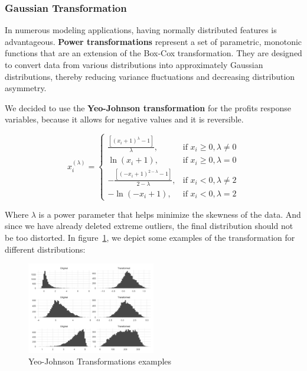 \documentclass[11pt,english,a4paper,hidelinks]{book}
\begin{document}
\subsubsection{Gaussian Transformation}

In numerous modeling applications, having normally distributed features is advantageous. \textbf{Power transformations} represent a set of parametric, monotonic functions that are an extension of the Box-Cox transformation. They are designed to convert data from various distributions into approximately Gaussian distributions, thereby reducing variance fluctuations and decreasing distribution asymmetry. 

\vspace{0.5cm}
\noindent We decided to use the \textbf{Yeo-Johnson transformation} for the profits response variables, because it allows for negative values and it is reversible.

\begin{equation}
x_i^{(\lambda)} =
\begin{cases}
\frac{[{(x_i + 1)}^\lambda - 1]}{\lambda}, & \text{if } x_i \geq 0, \lambda \neq 0 \\
\ln(x_i + 1), & \text{if } x_i \geq 0, \lambda = 0 \\
-\frac{[{(-x_i + 1)}^{2 - \lambda} - 1]}{2 - \lambda}, & \text{if } x_i < 0, \lambda \neq 2 \\
-\ln(-x_i + 1), & \text{if } x_i < 0, \lambda = 2
\end{cases}
\end{equation}

\noindent Where \(\lambda\) is a power parameter that helps minimize the skewness of the data. And since we have already deleted extreme outliers, the final distribution should not be too distorted. In figure~\ref{fig:yeo-johnson}, we depict some examples of the transformation for different distributions:

\begin{figure}[H]
    \centering
    \includegraphics[width=0.5\textwidth]{images/code/transformations/yeo-johnson.png}
    \caption{Yeo-Johnson Transformations examples}
    \label{fig:yeo-johnson}
\end{figure}
\end{document}
